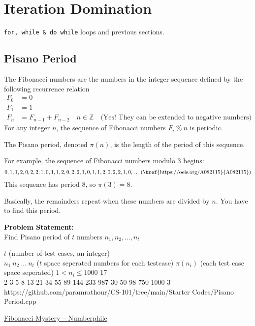 \section{Iteration Domination}
\begin{topics}
\verb!for, while & do while! loops and previous sections.
\end{topics}
\subsection{Pisano Period}
The Fibonacci numbers are the numbers in the integer sequence defined by the following recurrence relation
\begin{equation}
	\begin{aligned}
		F_0 &= 0\\
		F_1 &= 1 \\
		F_n &= F_{n-1} + F_{n-2}\quad n \in \mathbb{Z}\quad\text{(Yes! They can be extended to negative numbers)}
	\end{aligned}
\end{equation}
For any integer $n$, the sequence of Fibonacci numbers $F_i \ \%\ n$ is periodic.

The Pisano period, denoted $\pi(n)$, is the length of the period of this sequence.

For example, the sequence of Fibonacci numbers modulo 3 begins:
\begin{equation*}
	0, 1, 1, 2, 0, 2, 2, 1, 0, 1, 1, 2, 0, 2, 2, 1, 0, 1, 1, 2, 0, 2, 2, 1, 0,\ldots\text{(\href{https://oeis.org/A082115}{A082115})}
\end{equation*}
This sequence has period 8, so $\pi(3) = 8$.

Basically, the remainders repeat when these numbers are divided by $n$. You have to find this period.

\textbf{Problem Statement:}\\
Find Pisano period of $t$ numbers $n_1,n_2,\ldots,n_t$
\begin{testcases}
	{$t$ \hfill(number of test cases, an integer)\\
	$n_1\ n_2\ \ldots\ n_t$ \hfill($t$ space seperated numbers for each testcase)}
	{$\pi(n_i)$ \hfill(each test case space seperated)}
	{$1 < n_i \leq 1000$}
	{17\\2 3 5 8 13 21 34 55 89 144 233 987 30 50 98 750 1000}
	{3}
	{https://github.com/paramrathour/CS-101/tree/main/Starter Codes/Pisano Period.cpp}
\end{testcases}
\begin{funvideo}
\href{https://youtu.be/Nu-lW-Ifyec}{Fibonacci Mystery -- Numberphile}
\end{funvideo}

